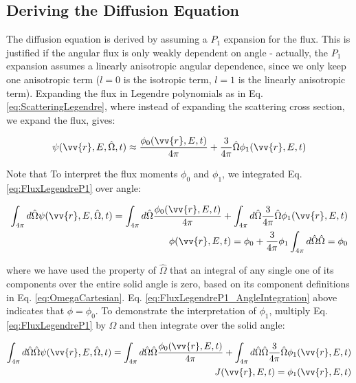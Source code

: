 \documentclass[10pt]{article}
\newcommand{\hO}{\hat{\Omega}}
\newcommand{\spa}{(\vv{r}, E, \hO, t)}
\begin{document}
\begin{flushleft}
\section{Deriving the Diffusion Equation}

The diffusion equation is derived by assuming a \(P_1\) expansion for the flux. This is justified if the angular flux is only weakly dependent on angle - actually, the \(P_1\) expansion assumes a linearly anisotropic angular dependence, since we only keep one anisotropic term (\(l=0\) is the isotropic term, \(l=1\) is the linearly anisotropic term). Expanding the flux in Legendre polynomials as in Eq. \ref{eq:ScatteringLegendre}, where instead of expanding the scattering cross section, we expand the flux, gives:

\begin{equation}
\label{eq:FluxLegendreP1}
\psi\spa  \approx \frac{\phi_0(\vv{r}, E, t)}{4\pi} + \frac{3}{4\pi} \hO  \phi_1(\vv{r}, E, t)
\end{equation}

Note that To interpret the flux moments \(\phi_0\) and \(\phi_1\), we integrated Eq. \ref{eq:FluxLegendreP1} over angle:

\begin{equation}
\label{eq:FluxLegendreP1_AngleIntegration}
\begin{aligned}
\int_{4\pi}^{} d\hO   \psi\spa  = \int_{4\pi}^{} d\hO   \frac{\phi_0(\vv{r}, E, t)}{4\pi} + \int_{4\pi}^{} d\hO   \frac{3}{4\pi} \hO  \phi_1(\vv{r}, E, t)\\
\phi(\vv{r}, E, t) = \phi_0 + \frac{3}{4\pi}\phi_1\int_{4\pi}^{} d\hO  \hO   = \phi_0
\end{aligned}
\end{equation}

where we have used the property of \(\hO  \) that an integral of any single one of its components over the entire solid angle is zero, based on its component definitions in Eq. \ref{eq:OmegaCartesian}. Eq. \ref{eq:FluxLegendreP1_AngleIntegration} above indicates that \(\phi = \phi_0\). To demonstrate the interpretation of \(\phi_1\), multiply Eq. \ref{eq:FluxLegendreP1} by \(\hO  \) and then integrate over the solid angle:

\begin{equation}
\label{eq:FluxLegendreP1_AngleIntegration2}
\begin{aligned}
\int_{4\pi}^{} d\hO   \hO  \psi\spa  = \int_{4\pi}^{} d\hO   \hO  \frac{\phi_0(\vv{r}, E, t)}{4\pi} + \int_{4\pi}^{} d\hO   \hO  \frac{3}{4\pi} \hO  \phi_1(\vv{r}, E, t)\\
J(\vv{r}, E, t) = \phi_1(\vv{r}, E, t)\\
\end{aligned}
\end{equation}


\end{flushleft}
\end{document}

